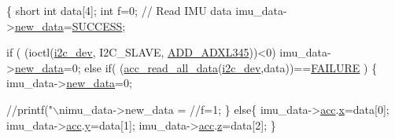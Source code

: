 \begin{DoxyCode}
\{
  \textcolor{keywordtype}{short} \textcolor{keywordtype}{int} data[4];
  \textcolor{keywordtype}{int} f=0;
  \textcolor{comment}{// Read IMU data}
  imu\_data->\hyperlink{structIMU__DATA__STRUCT_a99924252176326418863e511d4fa437b}{new\_data}=\hyperlink{calibration_2calibration_8h_aa90cac659d18e8ef6294c7ae337f6b58}{SUCCESS};
  
  \textcolor{keywordflow}{if} ( (ioctl(\hyperlink{CommunicationV0_2communication_8c_a7751bd45ac1064efb35adf1f19c25db8}{i2c\_dev}, I2C\_SLAVE, \hyperlink{communication_2imu__functions_8h_a909f4a5773e20e672cdb4088e1cfa22f}{ADD\_ADXL345}))<0) 
        imu\_data->\hyperlink{structIMU__DATA__STRUCT_a99924252176326418863e511d4fa437b}{new\_data}=0;
  \textcolor{keywordflow}{else} \textcolor{keywordflow}{if}( (\hyperlink{group__acc_ga013bb5ed8a763883fc440549d2b1a6ce}{acc\_read\_all\_data}(\hyperlink{CommunicationV0_2communication_8c_a7751bd45ac1064efb35adf1f19c25db8}{i2c\_dev},data))==\hyperlink{calibration_2calibration_8h_a6d58f9ac447476b4e084d7ca383f5183}{FAILURE}
       )
  \{
        imu\_data->\hyperlink{structIMU__DATA__STRUCT_a99924252176326418863e511d4fa437b}{new\_data}=0;
        \textcolor{comment}{//printf("\(\backslash\)nimu\_data->new\_data = %
        \textcolor{comment}{//f=1;}
  \}
  \textcolor{keywordflow}{else}\{
    imu\_data->\hyperlink{structIMU__DATA__STRUCT_a448f284bf44eb503affda586ad5fa9d2}{acc}.\hyperlink{structDATA__XYZ_a54c1596e9f9969fd9c21e8458024ecfb}{x}=data[0];
    imu\_data->\hyperlink{structIMU__DATA__STRUCT_a448f284bf44eb503affda586ad5fa9d2}{acc}.\hyperlink{structDATA__XYZ_a94bbb1c889bf53eb6a5fffa2b39322cf}{y}=data[1];
    imu\_data->\hyperlink{structIMU__DATA__STRUCT_a448f284bf44eb503affda586ad5fa9d2}{acc}.\hyperlink{structDATA__XYZ_a69e89ab0ec6e5d72fc5d54f62cc07fb5}{z}=data[2];  
  \}
  
}
\end{DoxyCode}
